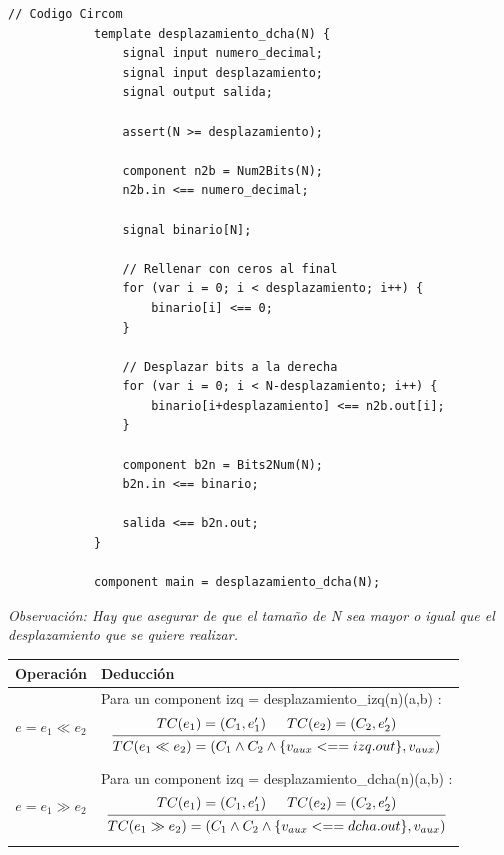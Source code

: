 \documentclass[a4paper,10pt]{article}
\begin{document}
		\begin{lstlisting}[language=Circom]
			// Codigo Circom
			template desplazamiento_dcha(N) {
				signal input numero_decimal;
				signal input desplazamiento;
				signal output salida;
				
				assert(N >= desplazamiento);
				
				component n2b = Num2Bits(N);
				n2b.in <== numero_decimal;
				
				signal binario[N];
				
				// Rellenar con ceros al final
				for (var i = 0; i < desplazamiento; i++) {
					binario[i] <== 0;
				}
				
				// Desplazar bits a la derecha
				for (var i = 0; i < N-desplazamiento; i++) {
					binario[i+desplazamiento] <== n2b.out[i];
				}
				
				component b2n = Bits2Num(N);
				b2n.in <== binario;
				
				salida <== b2n.out;
			}
			
			component main = desplazamiento_dcha(N);
		\end{lstlisting}
		
		\noindent \textit{Observación: Hay que asegurar de que el tamaño de N sea mayor o igual que el desplazamiento que se quiere realizar.}
		
		\vspace{0.5cm}
		
		\begin{tabular}{|c|>{\centering\arraybackslash}p{14cm}|}
			\hline
			\textbf{Operación} & \textbf{Deducción} \\
			\hline
			
			\texttt{$e= e_1 \ll e_2$} & 
				\makecell[c]{ 
				Para un component izq = desplazamiento\_izq(n)(a,b) : \\[6pt] 
				$$ 
				\begin{prooftree} 
					\hypo{TC(e_1) = (C_1, e'_1)} 
					\hypo {TC(e_2) = (C_2, e'_2)} 
					\infer2{TC(e_1 \ll e_2) = (C_1 \wedge C_2 \wedge \{v_{aux} <== izq.out\}, v_{aux})}
				\end{prooftree} 
				$$} \\
			
			\hline
			
				\texttt{$e= e_1 \gg e_2$} & 
			\makecell[c]{ 
				Para un component izq = desplazamiento\_dcha(n)(a,b) : \\[6pt] 
				$$ 
				\begin{prooftree} 
					\hypo{TC(e_1) = (C_1, e'_1)} 
					\hypo {TC(e_2) = (C_2, e'_2)} 
					\infer2{TC(e_1 \gg e_2) = (C_1 \wedge C_2 \wedge \{v_{aux} <== dcha.out\}, v_{aux})}
				\end{prooftree} 
				$$} \\
				
			\hline
		\end{tabular}
			
		
\end{document}
